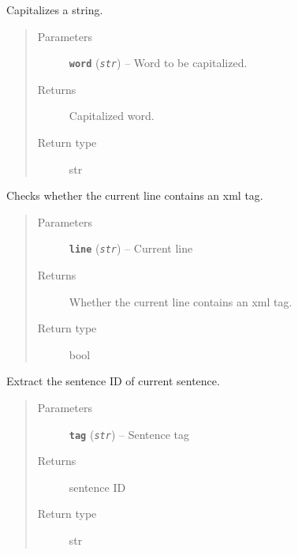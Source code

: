 \documentclass[letterpaper,10pt,english]{sphinxmanual}
\begin{document}

\begin{fulllineitems}
\label{src.misc:src.misc.helpers.capitalize}
Capitalizes a string.
\begin{quote}\begin{description}
\item[{Parameters}] \leavevmode
\textbf{\texttt{word}} (\emph{\texttt{str}}) -- Word to be capitalized.

\item[{Returns}] \leavevmode
Capitalized word.

\item[{Return type}] \leavevmode
str

\end{description}\end{quote}

\end{fulllineitems}


\begin{fulllineitems}
\label{src.misc:src.misc.helpers.contains_tag}
Checks whether the current line contains an xml tag.
\begin{quote}\begin{description}
\item[{Parameters}] \leavevmode
\textbf{\texttt{line}} (\emph{\texttt{str}}) -- Current line

\item[{Returns}] \leavevmode
Whether the current line contains an xml tag.

\item[{Return type}] \leavevmode
bool

\end{description}\end{quote}

\end{fulllineitems}


\begin{fulllineitems}
\label{src.misc:src.misc.helpers.extract_sentence_id}
Extract the sentence ID of current sentence.
\begin{quote}\begin{description}
\item[{Parameters}] \leavevmode
\textbf{\texttt{tag}} (\emph{\texttt{str}}) -- Sentence tag

\item[{Returns}] \leavevmode
sentence ID

\item[{Return type}] \leavevmode
str

\end{description}\end{quote}

\end{fulllineitems}
\end{document}
